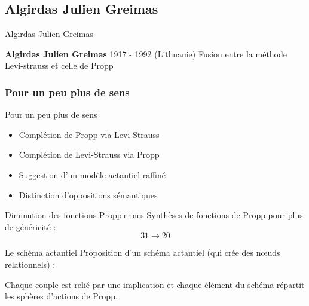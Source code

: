 \documentclass{beamer}
\begin{document}
\subsection{Algirdas Julien Greimas}
\begin{frame}{Algirdas Julien Greimas}
  \begin{block}{\textbf{Algirdas Julien Greimas} 1917 - 1992 (Lithuanie) }
    Fusion entre la méthode Levi-strauss et celle de Propp
  \end{block}
\end{frame}

\subsubsection{Pour un peu plus de sens}
\begin{frame}{Pour un peu plus de sens}
  \begin{itemize}
    \item Complétion de Propp via Levi-Strauss
    \item Complétion de Levi-Strauss via Propp
    \item Suggestion d'un modèle actantiel raffiné
    \item Distinction d'oppositions sémantiques
  \end{itemize}
\end{frame}

\begin{frame}{Diminution des fonctions Proppiennes}
  Synthèses de fonctions de Propp pour plus de généricité : 
$$31 \rightarrow 20$$
\end{frame}

\begin{frame}{Le schéma actantiel}
  Proposition d'un schéma actantiel (qui crée des nœuds relationnels) :\newline
  \newline
  \begin{block}{}
    Chaque couple est relié par une implication et chaque élément du schéma répartit les sphères d'actions de Propp.
  \end{block}
\end{frame}
\end{document}
